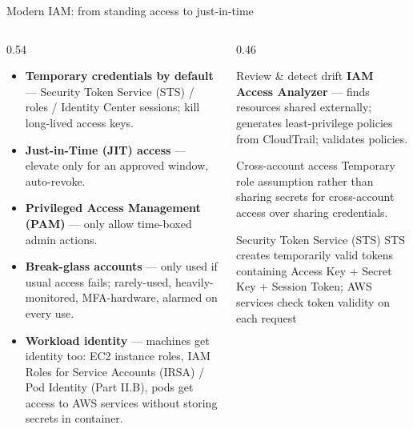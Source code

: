 \documentclass[aspectratio=169,10pt]{beamer}
\newcommand{\svc}[1]{{\color{accent}\textsf{\textbf{#1}}}}      %
\newcommand{\term}[1]{{\color{awsink}\textbf{#1}}}
\begin{document}
\begin{frame}{Modern IAM: from standing access to just-in-time}
  \begin{columns}[T]
    \begin{column}{0.54\textwidth}\small
      \begin{itemize}
        \item \term{Temporary credentials by default} --- Security Token Service (STS) / roles / Identity Center sessions;
              kill long-lived access keys.
        \item \term{Just-in-Time (JIT) access} --- elevate only for an approved window, auto-revoke.
        \item \term{Privileged Access Management (PAM)} --- only allow time-boxed admin actions.
        \item \term{Break-glass accounts} --- only used if usual access fails; rarely-used, heavily-monitored, MFA-hardware,
              alarmed on every use.
        \item \term{Workload identity} --- machines get identity too: EC2 instance roles,
              IAM Roles for Service Accounts (IRSA) / Pod Identity (Part II.B), pods get access to AWS services without storing secrets in container.
      \end{itemize}
    \end{column}
    \begin{column}{0.46\textwidth}
      \begin{block}{\footnotesize Review \& detect drift}
        \footnotesize
        \svc{IAM Access Analyzer} --- finds resources shared externally; generates
        least-privilege policies from CloudTrail; validates policies.
      \end{block}
      \begin{block}{\footnotesize Cross-account access}
        \footnotesize Temporary role assumption rather than sharing secrets for cross-account access
        over sharing credentials.
      \end{block}
       \begin{block}{\footnotesize Security Token Service (STS)}
        \footnotesize STS creates temporarily valid tokens containing Access Key + Secret Key + Session Token; AWS services check token validity on each request%
      \end{block}
      
    \end{column}
  \end{columns}
\end{frame}
\end{document}
